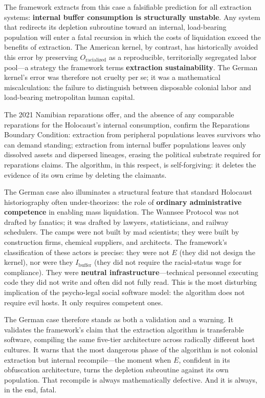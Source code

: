 The framework extracts from this case a falsifiable prediction for all extraction systems: \textbf{internal buffer consumption is structurally unstable}. Any system that redirects its depletion subroutine toward an internal, load-bearing population will enter a fatal recursion in which the costs of liquidation exceed the benefits of extraction. The American kernel, by contrast, has historically avoided this error by preserving $O_{\text{racialized}}$ as a reproducible, territorially segregated labor pool---a strategy the framework terms \textbf{extraction sustainability}. The German kernel's error was therefore not cruelty per se; it was a mathematical miscalculation: the failure to distinguish between disposable colonial labor and load-bearing metropolitan human capital.

The 2021 Namibian reparations offer, and the absence of any comparable reparations for the Holocaust's internal consumption, confirm the Reparations Boundary Condition: extraction from peripheral populations leaves survivors who can demand standing; extraction from internal buffer populations leaves only dissolved assets and dispersed lineages, erasing the political substrate required for reparations claims. The algorithm, in this respect, is self-forgiving: it deletes the evidence of its own crime by deleting the claimants.

The German case also illuminates a structural feature that standard Holocaust historiography often under-theorizes: the role of \textbf{ordinary administrative competence} in enabling mass liquidation. The Wannsee Protocol was not drafted by fanatics; it was drafted by lawyers, statisticians, and railway schedulers. The camps were not built by mad scientists; they were built by construction firms, chemical suppliers, and architects. The framework's classification of these actors is precise: they were not $E$ (they did not design the kernel), nor were they $I_{\text{buffer}}$ (they did not require the racial-status wage for compliance). They were \textbf{neutral infrastructure}---technical personnel executing code they did not write and often did not fully read. This is the most disturbing implication of the psycho-legal social software model: the algorithm does not require evil hosts. It only requires competent ones.

The German case therefore stands as both a validation and a warning. It validates the framework's claim that the extraction algorithm is transferable software, compiling the same five-tier architecture across radically different host cultures. It warns that the most dangerous phase of the algorithm is not colonial extraction but internal recompile---the moment when $E$, confident in its obfuscation architecture, turns the depletion subroutine against its own population. That recompile is always mathematically defective. And it is always, in the end, fatal.

